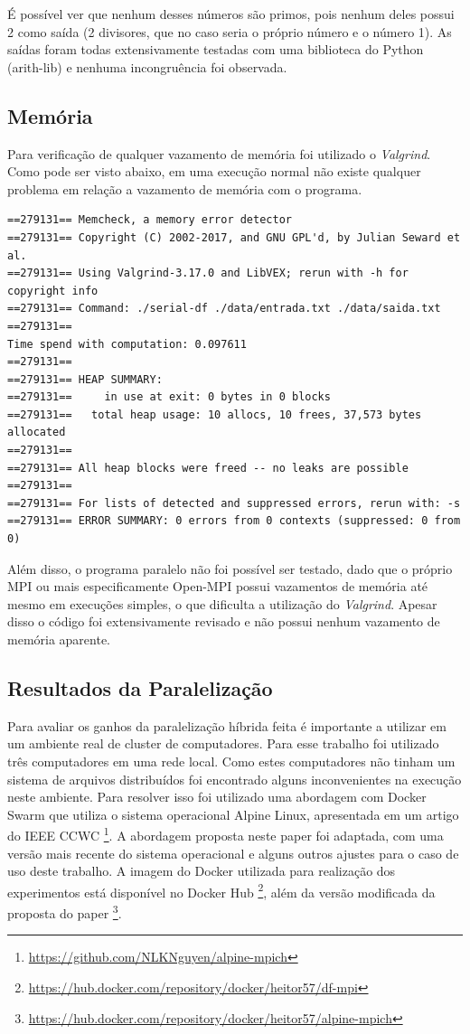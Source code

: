 \documentclass[12pt]{article}
\begin{document}
É possível ver que nenhum desses números são primos, pois nenhum deles possui 2 como saída (2 divisores, que no caso seria o próprio número e o número 1). As saídas foram todas extensivamente testadas com uma biblioteca do Python (arith-lib) e nenhuma incongruência foi observada.

\subsection{Memória}

Para verificação de qualquer vazamento de memória foi utilizado o \textit{Valgrind}. Como pode ser visto abaixo, em uma execução normal não existe qualquer problema em relação a vazamento de memória com o programa.

	{
		\scriptsize
		\begin{verbatim}
==279131== Memcheck, a memory error detector
==279131== Copyright (C) 2002-2017, and GNU GPL'd, by Julian Seward et al.
==279131== Using Valgrind-3.17.0 and LibVEX; rerun with -h for copyright info
==279131== Command: ./serial-df ./data/entrada.txt ./data/saida.txt
==279131== 
Time spend with computation: 0.097611
==279131== 
==279131== HEAP SUMMARY:
==279131==     in use at exit: 0 bytes in 0 blocks
==279131==   total heap usage: 10 allocs, 10 frees, 37,573 bytes allocated
==279131== 
==279131== All heap blocks were freed -- no leaks are possible
==279131== 
==279131== For lists of detected and suppressed errors, rerun with: -s
==279131== ERROR SUMMARY: 0 errors from 0 contexts (suppressed: 0 from 0)
\end{verbatim}
	}

Além disso, o programa paralelo não foi possível ser testado, dado que o próprio MPI ou mais especificamente Open-MPI possui vazamentos de memória até mesmo em execuções simples, o que dificulta a utilização do \textit{Valgrind}. Apesar disso o código foi extensivamente revisado e não possui nenhum vazamento de memória aparente.

\subsection{Resultados da Paralelização}

Para avaliar os ganhos da paralelização híbrida feita é importante a utilizar em um ambiente real de cluster de computadores. Para esse trabalho foi utilizado três computadores em uma rede local. Como estes computadores não tinham um sistema de arquivos distribuídos foi encontrado alguns inconvenientes na execução neste ambiente. Para resolver isso foi utilizado uma abordagem com Docker Swarm que utiliza o sistema operacional Alpine Linux, apresentada em um artigo do IEEE CCWC \cite{nguyen2017distributed}\footnote{\url{https://github.com/NLKNguyen/alpine-mpich}}. A abordagem proposta neste paper foi adaptada, com uma versão mais recente do sistema operacional e alguns outros ajustes para o caso de uso deste trabalho. A imagem do Docker utilizada para realização dos experimentos está disponível no Docker Hub \footnote{\url{https://hub.docker.com/repository/docker/heitor57/df-mpi}}, além da versão modificada da proposta do paper \footnote{\url{https://hub.docker.com/repository/docker/heitor57/alpine-mpich}}.
\end{document}
